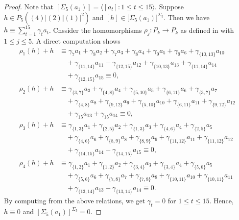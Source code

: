 \documentclass[reqno]{amsart}
\theoremstyle{plain}
\theoremstyle{definition}
\theoremstyle{plain}
\theoremstyle{definition}
\numberwithin{equation}{section}
\begin{document}
\begin{proof}
Note that $[\Sigma_5(a_1)] = \langle [a_t]: 1 \leqslant t \leqslant 15\rangle$. Suppose $h \in P_5((4)|(2)|(1)|^2)$ and $[h] \in \mathcal [\Sigma_5(a_1)]^{\Sigma_5}$. Then we have
$h \equiv \sum_{t=1}^{15}\gamma_ta_t$. Cnssider the homomorphisms $\rho_j: P_k \to P_k$ as defined in \cite[Page 46]{suw} with $1 \leqslant j \leqslant 5$. A direct computation shows
\begin{align*}
\rho_1(h)+h &\equiv \gamma_{7}a_{1} + \gamma_{8}a_{2} + \gamma_{7}a_{3} + \gamma_{8}a_{4} + \gamma_{9}a_{5} + \gamma_{9}a_{6} + \gamma_{\{10,13\}}a_{10}\\ 
&\quad + \gamma_{\{11,14\}}a_{11} + \gamma_{\{12,15\}}a_{12} + \gamma_{\{10,13\}}a_{13} + \gamma_{\{11,14\}}a_{14}\\ 
&\quad + \gamma_{\{12,15\}}a_{15} \equiv 0,\\ 
\rho_2(h)+h &\equiv \gamma_{\{3,7\}}a_{3} + \gamma_{\{4,8\}}a_{4} + \gamma_{\{5,10\}}a_{5} + \gamma_{\{6,11\}}a_{6} + \gamma_{\{3,7\}}a_{7}\\ 
&\quad + \gamma_{\{4,8\}}a_{8} + \gamma_{\{9,12\}}a_{9} + \gamma_{\{5,10\}}a_{10} + \gamma_{\{6,11\}}a_{11} + \gamma_{\{9,12\}}a_{12}\\ 
&\quad + \gamma_{15}a_{13} + \gamma_{15}a_{14} \equiv 0,\\
\rho_3(h)+h &\equiv \gamma_{\{1,3\}}a_{1} + \gamma_{\{2,5\}}a_{2} + \gamma_{\{1,3\}}a_{3} + \gamma_{\{4,6\}}a_{4} + \gamma_{\{2,5\}}a_{5}\\ 
&\quad + \gamma_{\{4,6\}}a_{6} + \gamma_{\{8,9\}}a_{8} + \gamma_{\{8,9\}}a_{9} + \gamma_{\{11,12\}}a_{11} + \gamma_{\{11,12\}}a_{12}\\ 
&\quad + \gamma_{\{14,15\}}a_{14} + \gamma_{\{14,15\}}a_{15} \equiv 0,\\
\rho_4(h)+h &\equiv \gamma_{\{1,2\}}a_{1} + \gamma_{\{1,2\}}a_{2} + \gamma_{\{3,4\}}a_{3} + \gamma_{\{3,4\}}a_{4} + \gamma_{\{5,6\}}a_{5}\\ 
&\quad + \gamma_{\{5,6\}}a_{6} + \gamma_{\{7,8\}}a_{7} + \gamma_{\{7,8\}}a_{8} + \gamma_{\{10,11\}}a_{10} + \gamma_{\{10,11\}}a_{11}\\ 
&\quad + \gamma_{\{13,14\}}a_{13} + \gamma_{\{13,14\}}a_{14} \equiv 0.
\end{align*}
By computing from the above relations, we get $\gamma_t = 0$ for $1 \leqslant t \leqslant 15$. Hence, $h \equiv 0$ and $[\Sigma_5(a_1)]^{\Sigma_5} = 0$.
\end{proof}
\end{document}
